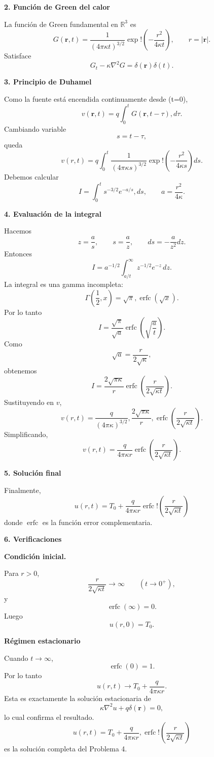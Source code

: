 \documentclass[11pt,spanish]{article}
\begin{document}
{\bf 2. Función de Green del calor}

La función de Green fundamental en $\mathbb R^3$ es
$$
G(\mathbf r,t)
=
\frac{1}{(4\pi\kappa t)^{3/2}}
\exp!\left(
-\frac{r^2}{4\kappa t}
\right),
\qquad
r=|\mathbf r|.
$$
Satisface
$$
G_t-\kappa\nabla^2G
=
\delta(\mathbf r)\delta(t).
$$

{\bf 3. Principio de Duhamel}

Como la fuente está encendida continuamente desde (t=0),
$$
v(\mathbf r,t)
=
q\int_0^t
G(\mathbf r,t-\tau),d\tau.
$$
Cambiando variable
$$
s=t-\tau,
$$
queda
$$
v(r,t)
=
q\int_0^t
\frac{1}{(4\pi\kappa s)^{3/2}}
\exp!\left(
-\frac{r^2}{4\kappa s}
\right)
ds.
$$
Debemos calcular
$$
I=
\int_0^t
s^{-3/2}
e^{-a/s},ds,
\qquad
a=\frac{r^2}{4\kappa}.
$$

{\bf 4. Evaluación de la integral}

Hacemos
$$
z=\frac{a}{s},
\qquad
s=\frac{a}{z},
\qquad
ds=-\frac{a}{z^2}dz.
$$
Entonces
$$
I
=
a^{-1/2}
\int_{a/t}^{\infty}
z^{-1/2}e^{-z}\,dz.
$$
La integral es una gamma incompleta:
$$
\Gamma\left(\frac12,x\right)
=
\sqrt{\pi},\operatorname{erfc}(\sqrt x).
$$
Por lo tanto
$$
I
=
\frac{\sqrt{\pi}}{\sqrt a}
\operatorname{erfc}
\left(
\sqrt{\frac{a}{t}}
\right).
$$
Como
$$
\sqrt a
=
\frac{r}{2\sqrt{\kappa}},
$$
obtenemos
$$
I
=
\frac{2\sqrt{\pi\kappa}}{r}
\operatorname{erfc}
\left(
\frac{r}{2\sqrt{\kappa t}}
\right).
$$
Sustituyendo en $v$,
$$
v(r,t)
=
\frac{q}{(4\pi\kappa)^{3/2}}
,
\frac{2\sqrt{\pi\kappa}}{r}
,
\operatorname{erfc}
\left(
\frac{r}{2\sqrt{\kappa t}}
\right).
$$
Simplificando,
$$
v(r,t)
=
\frac{q}{4\pi\kappa r}
\operatorname{erfc}
\left(
\frac{r}{2\sqrt{\kappa t}}
\right).
$$

{\bf 5. Solución final}

Finalmente,
$$
\boxed{
u(r,t)
=
T_0
+
\frac{q}{4\pi\kappa r}
\operatorname{erfc}
!\left(
\frac{r}{2\sqrt{\kappa t}}
\right)
}
$$
donde $\operatorname{erfc}$ es la función error complementaria.

{\bf 6. Verificaciones}

{\bf Condición inicial.}

Para $r>0$,
$$
\frac{r}{2\sqrt{\kappa t}}
\to\infty
\qquad (t\to0^+),
$$
y
$$
\operatorname{erfc}(\infty)=0.
$$
Luego
$$
u(r,0)=T_0.
$$

{\bf Régimen estacionario}

Cuando $t\to\infty$,
$$
\operatorname{erfc}(0)=1.
$$
Por lo tanto
$$
u(r,t)\longrightarrow
T_0+\frac{q}{4\pi\kappa r}.
$$
Esta es exactamente la solución estacionaria de
$$
\kappa\nabla^2u+q\delta(\mathbf r)=0,
$$
lo cual confirma el resultado.
$$
\boxed{
u(r,t)=
T_0+\frac{q}{4\pi\kappa r},
\operatorname{erfc}!\left(\frac{r}{2\sqrt{\kappa t}}\right)
}
$$
es la solución completa del Problema 4.



 
%
%
\end{document}
